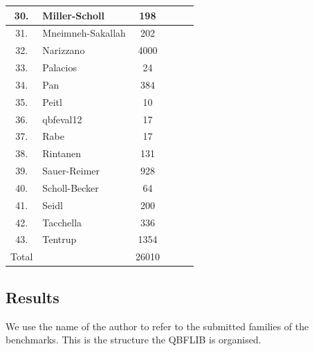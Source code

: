 \documentclass[runningheads]{llncs}
\begin{document}
\begin{table}
\begin{tabular}{c|l|c|c|c|c}
30. & Miller-Scholl & 198 & &  &  \\ \hline

31. & Mneimneh-Sakallah &  202 & &  &  \\ \hline

32. & Narizzano &  4000 & &  &  \\ \hline 

33. & Palacios & 24 &  &  &  \\ \hline

34. & Pan &  384 & &  &  \\ \hline

35. & Peitl & 10 &  &  &  \\\hline

36. & qbfeval12 & 17 & &  &  \\ \hline

37. & Rabe &  17 &  & &  \\ \hline

38. & Rintanen &  131 & &  &  \\\hline

39. & Sauer-Reimer &  928 & &  & \\ \hline

40. & Scholl-Becker & 64 &  &  &  \\ \hline

41. & Seidl &  200 &  &  &  \\ \hline

42. & Tacchella &  336 & &  &  \\ \hline 

43. & Tentrup & 1354 &  &  &  \\ \hline \hline

Total &  & 26010 &  &  &  \\  \hline \hline
 

\hline
\end{tabular}
\end{table}


\subsection{Results}
We use the name of the author to refer to the submitted families of the benchmarks. This is the structure the QBFLIB is organised.
\end{document}
